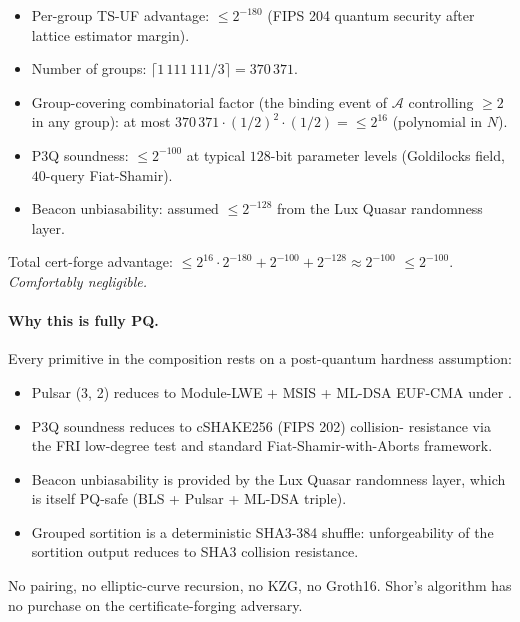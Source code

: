 \begin{itemize}[leftmargin=*, itemsep=0pt]
\item Per-group TS-UF advantage: $\le 2^{-180}$ (FIPS 204 quantum
security after lattice estimator margin).
\item Number of groups: $\lceil 1\,111\,111 / 3 \rceil = 370\,371$.
\item Group-covering combinatorial factor (the binding event of
$\mathcal{A}$ controlling $\ge 2$ in any group): at most
$370\,371 \cdot (1/2)^2 \cdot (1/2) = \le 2^{16}$ (polynomial in $N$).
\item P3Q soundness: $\le 2^{-100}$ at typical $128$-bit parameter
levels (Goldilocks field, $40$-query Fiat-Shamir).
\item Beacon unbiasability: assumed $\le 2^{-128}$ from the Lux
Quasar randomness layer.
\end{itemize}

\noindent Total cert-forge advantage:
$\le 2^{16} \cdot 2^{-180} + 2^{-100} + 2^{-128} \approx 2^{-100}$
$\le 2^{-100}$. \emph{Comfortably negligible.}

\paragraph{Why this is fully PQ.}
Every primitive in the composition rests on a post-quantum hardness
assumption:

\begin{itemize}[leftmargin=*, itemsep=0pt]
\item Pulsar (3, 2) reduces to Module-LWE + MSIS + ML-DSA EUF-CMA
under .
\item P3Q soundness reduces to cSHAKE256 (FIPS 202) collision-
resistance via the FRI low-degree test and standard
Fiat-Shamir-with-Aborts framework.
\item Beacon unbiasability is provided by the Lux Quasar
randomness layer, which is itself PQ-safe (BLS + Pulsar + ML-DSA
triple).
\item Grouped sortition is a deterministic SHA3-384 shuffle:
unforgeability of the sortition output reduces to SHA3 collision
resistance.
\end{itemize}

No pairing, no elliptic-curve recursion, no KZG, no Groth16. Shor's
algorithm has no purchase on the certificate-forging adversary.

